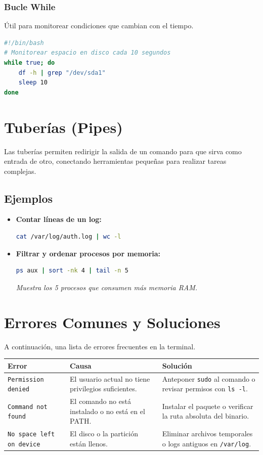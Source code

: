\documentclass[a4paper,12pt]{article}
\begin{document}
\subsubsection{Bucle While}
Útil para monitorear condiciones que cambian con el tiempo.
\begin{lstlisting}[language=bash]
#!/bin/bash
# Monitorear espacio en disco cada 10 segundos
while true; do
    df -h | grep "/dev/sda1"
    sleep 10
done
\end{lstlisting}

\section{Tuberías (Pipes)}
Las tuberías permiten redirigir la salida de un comando para que sirva como entrada de otro, conectando herramientas pequeñas para realizar tareas complejas.

\subsection{Ejemplos}
\begin{itemize}
    \item \textbf{Contar líneas de un log:}
    \begin{lstlisting}[language=bash]
    cat /var/log/auth.log | wc -l
    \end{lstlisting}
    
    \item \textbf{Filtrar y ordenar procesos por memoria:}
    \begin{lstlisting}[language=bash]
    ps aux | sort -nk 4 | tail -n 5
    \end{lstlisting}
    \textit{Muestra los 5 procesos que consumen más memoria RAM.}
\end{itemize}

\section{Errores Comunes y Soluciones}
A continuación, una lista de errores frecuentes en la terminal.

\begin{table}[h!]
\centering
\begin{tabular}{|p{3cm}|p{4cm}|p{5cm}|}
\hline
\textbf{Error} & \textbf{Causa} & \textbf{Solución} \\ \hline
\texttt{Permission denied} & El usuario actual no tiene privilegios suficientes. & Anteponer \texttt{sudo} al comando o revisar permisos con \texttt{ls -l}. \\ \hline
\texttt{Command not found} & El comando no está instalado o no está en el PATH. & Instalar el paquete o verificar la ruta absoluta del binario. \\ \hline
\texttt{No space left on device} & El disco o la partición están llenos. & Eliminar archivos temporales o logs antiguos en \texttt{/var/log}. \\ \hline
\end{tabular}
\end{table}
\end{document}
